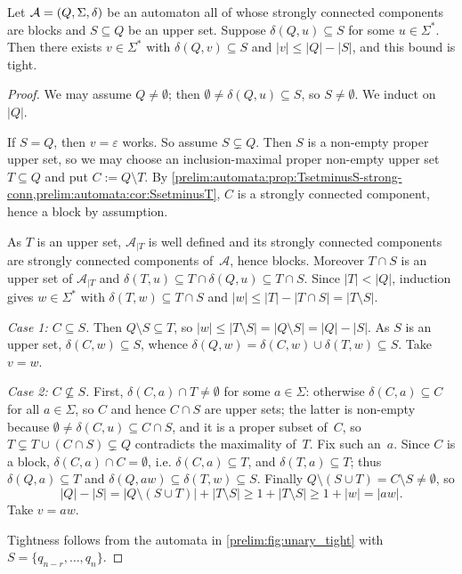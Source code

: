 \begin{proposition} \label{prelim:classes:block:prop:sync-into-bound}
	Let $\mathcal A = (Q, \Sigma, \delta)$ be an automaton all of whose strongly connected components are blocks and $S \subseteq Q$ be an upper set.
	Suppose $\delta(Q, u) \subseteq S$ for some $u \in \Sigma^*$.
		Then there exists $v \in \Sigma^*$
		with $\delta(Q, v) \subseteq S$ and $|v| \le |Q| - |S|$,
		and this bound is tight.
\end{proposition}
\begin{proof}
	We may assume $Q \ne \emptyset$; then $\emptyset \ne \delta(Q,u) \subseteq S$, so $S \ne \emptyset$.
	We induct on~$|Q|$.
	
	If $S = Q$, then $v = \varepsilon$ works. So assume $S \subsetneq Q$.
	Then $S$ is a non-empty proper upper set, so we may choose an inclusion-maximal
	proper non-empty upper set $T \subseteq Q$ and put $C := Q \setminus T$.
	By \cref{prelim:automata:prop:TsetminusS-strong-conn,prelim:automata:cor:SsetminusT},
	$C$ is a strongly connected component, hence a block by assumption.
	
	As $T$ is an upper set, $\mathcal A_{|T}$ is well defined and its strongly connected
	components are strongly connected components of~$\mathcal A$, hence blocks.
	Moreover $T \cap S$ is an upper set of $\mathcal A_{|T}$ and
	$\delta(T,u) \subseteq T \cap \delta(Q,u) \subseteq T \cap S$.
	Since $|T| < |Q|$, induction gives $w \in \Sigma^*$ with
	$\delta(T,w) \subseteq T \cap S$ and $|w| \le |T| - |T \cap S| = |T \setminus S|$.
	
	\emph{Case 1: $C \subseteq S$.} Then $Q \setminus S \subseteq T$, so
	$|w| \le |T \setminus S| = |Q \setminus S| = |Q| - |S|$.
	As $S$ is an upper set, $\delta(C,w) \subseteq S$, whence
	$\delta(Q,w) = \delta(C,w) \cup \delta(T,w) \subseteq S$. Take $v = w$.
	
	\emph{Case 2: $C \not\subseteq S$.} 	
	First, $\delta(C,a) \cap T \ne \emptyset$ for some
	$a \in \Sigma$: otherwise $\delta(C,a) \subseteq C$ for all $a \in \Sigma$, so $C$ and
	hence $C \cap S$ are upper sets; the latter is non-empty because
	$\emptyset \ne \delta(C,u) \subseteq C \cap S$, and it is a proper subset of~$C$,
	so $T \subsetneq T \cup (C \cap S) \subsetneq Q$ contradicts the maximality of~$T$.
	Fix such an~$a$. Since $C$ is a block, $\delta(C,a) \cap C = \emptyset$, i.e.
	$\delta(C,a) \subseteq T$, and $\delta(T,a) \subseteq T$; thus $\delta(Q,a) \subseteq T$
	and $\delta(Q,aw) \subseteq \delta(T,w) \subseteq S$.
	Finally $Q \setminus (S \cup T) = C \setminus S \ne \emptyset$, so
	\[
	|Q| - |S| = |Q \setminus (S \cup T)| + |T \setminus S|
	\ge 1 + |T \setminus S| \ge 1 + |w| = |aw| .
	\]
	Take $v = aw$.
	
	Tightness follows from the automata in \cref{prelim:fig:unary_tight}
	with $S = \{q_{n-r}, \ldots, q_n\}$.
\end{proof}

